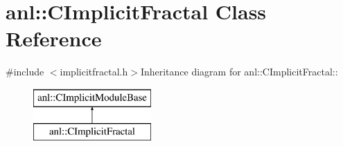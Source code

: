 \hypertarget{classanl_1_1CImplicitFractal}{
\section{anl::CImplicitFractal Class Reference}
\label{classanl_1_1CImplicitFractal}
}


{\ttfamily \#include $<$implicitfractal.h$>$}Inheritance diagram for anl::CImplicitFractal::\begin{figure}[H]
\begin{center}
\leavevmode
\includegraphics[height=2cm]{classanl_1_1CImplicitFractal}
\end{center}
\end{figure}
